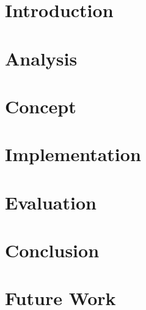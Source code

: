 \documentclass[a4paper, 12pt, oneside, BCOR1cm, toc=chapterentrywithdots]{scrbook}
\begin{document}
\tableofcontents

\listoffigures

\listoftables



\mainmatter

\chapter{Introduction}
\label{chap:introduction}


\chapter{Analysis}
\label{chap:analysis}


\chapter{Concept}
\label{chap:concept}


\chapter{Implementation}
\label{chap:implementation}


\chapter{Evaluation}
\label{chap:evaluation}


\chapter{Conclusion}
\label{chap:conclusion}


\chapter{Future Work}
\label{chap:future-work}

\end{document}
